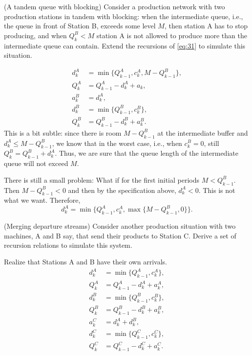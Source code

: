 \begin{exercise} (A tandem queue with blocking)
  Consider a production network with two production stations in tandem
  with blocking: when the intermediate queue, i.e., the queue in front of
  Station B, exceeds some level $M$, then station A has to stop
  producing, and when $Q^B_k < M$ station A is not allowed to produce
  more than the intermediate queue can contain. Extend the recursions
  of \eqref{eq:31} to simulate this situation.
\begin{solution}
\begin{equation}
  \begin{split}
    d^A_k &= \min\{Q_{k-1}^A, c_k^A, M-Q^B_{k-1}\}, \\
    Q_k^A &= Q_{k-1}^A -d_k^A + a_k, \\
    a_k^B &= d_{k}^A,\\
    d^B_k &= \min\{Q_{k-1}^B, c_k^B\}, \\
    Q_k^B &= Q_{k-1}^B -d_k^B + a_k^B.
  \end{split}
\end{equation}
This is a bit subtle: since there is room $M-Q^B_{k-1}$ at the
intermediate buffer and $d_k^A \leq M-Q^B_{k-1}$, we know that in the
worst case, i.e., when $c_k^B=0$, still $Q^B_k = Q_{k-1}^B +
d_k^A$.
Thus, we are sure that the queue length of the intermediate queue will
not exceed $M$.

There is still  a small problem: What if for the first initial periods  $M<Q^B_{k-1}$. Then $M-Q^B_{k-1}<0$ and then by the specification above, $d_k^A < 0$. This is not what we want. Therefore, 
\begin{equation*}
  d^A_k = \min\{Q_{k-1}^A, c_k^A, \max\{M-Q^B_{k-1}, 0\}\}.
\end{equation*}
\end{solution}
\end{exercise}

\begin{exercise} (Merging departure streams)
  Consider another production situation with two machines, A and B
  say, that send their products to Station C. Derive a set of
  recursion relations to simulate this system. 
\begin{solution}
Realize that Stations A and B have their own arrivals. 
\begin{equation}
  \begin{split}
    d^A_k &= \min\{Q_{k-1}^A, c_k^A\}, \\
    Q_k^A &= Q_{k-1}^A -d_k^A + a_k^A, \\
    d^B_k &= \min\{Q_{k-1}^B, c_k^B\}, \\
    Q_k^B &= Q_{k-1}^B -d_k^B + a_k^B, \\
    a_k^C &= d_{k}^A+d_{k}^B,\\
    d^C_k &= \min\{Q_{k-1}^C, c_k^C\}, \\
    Q_k^C &= Q_{k-1}^C -d_k^C + a_k^C.
  \end{split}
\end{equation}
\end{solution}
\end{exercise}


